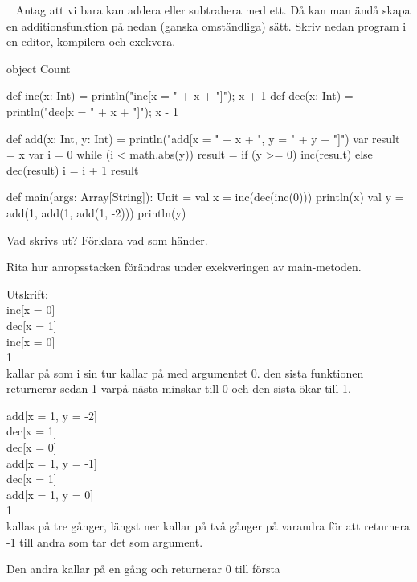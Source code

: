 \QUESTBEGIN

\Task  \what~  Antag att vi bara kan addera eller subtrahera med ett. Då kan man ändå skapa en additionsfunktion på nedan (ganska omständliga) sätt. Skriv nedan program i en editor, kompilera och exekvera.
\begin{Code}
object Count {
  def inc(x: Int) = {println("inc[x = " + x + "]"); x + 1}
  def dec(x: Int) = {println("dec[x = " + x + "]"); x - 1}

  def add(x: Int, y: Int) = {
    println("add[x = " + x + ", y = " + y + "]")
    var result = x
    var i = 0
    while (i < math.abs(y)){
      result = if (y >= 0) inc(result) else dec(result)
      i = i + 1
    }
    result
  }

  def main(args: Array[String]): Unit = {
    val x =  inc(dec(inc(0)))
    println(x)
    val y = add(1, add(1, add(1, -2)))
    println(y)
  }
}
\end{Code}

\Subtask Vad skrivs ut? Förklara vad som händer.

\Subtask Rita hur anropsstacken förändras under exekveringen av main-metoden.


\SOLUTION


\TaskSolved \what


\SubtaskSolved
Utskrift: \\
inc[x = 0]\\
dec[x = 1]\\
inc[x = 0]\\
1\\

 kallar på  som i sin tur kallar på  med argumentet 0. den sista funktionen returnerar sedan 1 varpå nästa minskar till 0 och den sista ökar till 1.

add[x = 1, y = -2]\\
dec[x = 1]\\
dec[x = 0]\\
add[x = 1, y = -1]\\
dec[x = 1]\\
add[x = 1, y = 0]\\
1\\

 kallas på tre gånger,  längst ner kallar på  två gånger på varandra för att returnera -1 till andra  som tar det som argument.

Den andra  kallar på  en gång och returnerar 0 till första 

